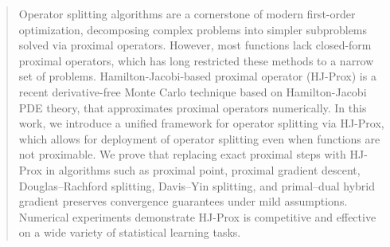 \documentclass{article}
\theoremstyle{plain}
\theoremstyle{definition}
\theoremstyle{remark}
\begin{document}
\printAffiliationsAndNotice{}  %

\begin{abstract}%
Operator splitting algorithms are a cornerstone of modern first-order optimization, decomposing complex problems into simpler subproblems solved via proximal operators. However, most functions lack closed-form proximal operators, which has long restricted these methods to a narrow set of problems. Hamilton-Jacobi-based proximal operator (HJ-Prox) is a recent derivative-free Monte Carlo technique based on Hamilton-Jacobi PDE theory, that approximates proximal operators numerically. In this work, we introduce a unified framework for operator splitting via HJ-Prox, which allows for deployment of operator splitting even when functions are not proximable. We prove that replacing exact proximal steps with HJ-Prox in algorithms such as proximal point, proximal gradient descent, Douglas–Rachford splitting, Davis–Yin splitting, and primal–dual hybrid gradient preserves convergence guarantees under mild assumptions. Numerical experiments demonstrate HJ-Prox is competitive and effective on a wide variety of statistical learning tasks.
\end{abstract}
\end{document}
